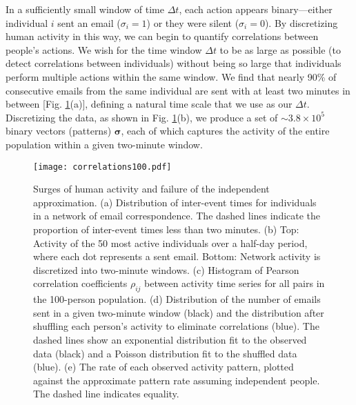 \documentclass[aps,reprint,superscriptaddress,amsmath,amssymb,longbibliography]{revtex4-1}
\begin{document}
In a sufficiently small window of time $\Delta t$, each action appears binary---either individual $i$ sent an email ($\sigma_i = 1$) or they were silent ($\sigma_i = 0$). By discretizing human activity in this way, we can begin to quantify correlations between people's actions. We wish for the time window $\Delta t$ to be as large as possible (to detect correlations between individuals) without being so large that individuals perform multiple actions within the same window. We find that nearly 90\% of consecutive emails from the same individual are sent with at least two minutes in between [Fig. \ref{correlations}(a)], defining a natural time scale that we use as our $\Delta t$. Discretizing the data, as shown in Fig. \ref{correlations}(b), we produce a set of $\sim 3.8\times 10^5$ binary vectors (patterns) $\bm{\sigma}$, each of which captures the activity of the entire population within a given two-minute window.

\begin{figure}
\centering
\texttt{[image: correlations100.pdf]}
\caption{\label{correlations} Surges of human activity and failure of the independent approximation. (a) Distribution of inter-event times for individuals in a network of email correspondence. The dashed lines indicate the proportion of inter-event times less than two minutes. (b) Top: Activity of the 50 most active individuals over a half-day period, where each dot represents a sent email. Bottom: Network activity is discretized into two-minute windows. (c) Histogram of Pearson correlation coefficients $\rho_{ij}$ between activity time series for all pairs in the 100-person population. (d) Distribution of the number of emails sent in a given two-minute window (black) and the distribution after shuffling each person's activity to eliminate correlations (blue). The dashed lines show an exponential distribution fit to the observed data (black) and a Poisson distribution fit to the shuffled data (blue). (e) The rate of each observed activity pattern, plotted against the approximate pattern rate assuming independent people. The dashed line indicates equality.}
\end{figure}
\end{document}
